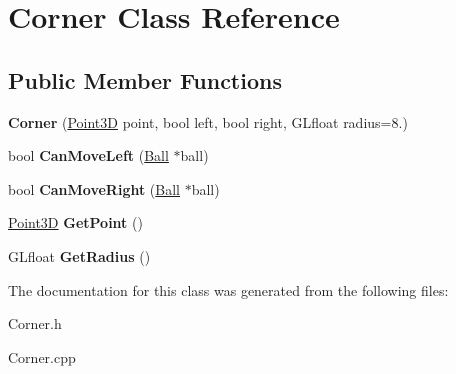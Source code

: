 \hypertarget{class_corner}{\section{Corner Class Reference}
\label{class_corner}
}
\subsection*{Public Member Functions}
\begin{DoxyCompactItemize}
\item 
\hypertarget{class_corner_ab55d2cbce25b09663c8df9bb9ac2210f}{{\bfseries Corner} (\hyperlink{struct_point3_d}{Point3\+D} point, bool left, bool right, G\+Lfloat radius=8.)}\label{class_corner_ab55d2cbce25b09663c8df9bb9ac2210f}

\item 
\hypertarget{class_corner_a4148b59b83d2b9cad19ec13f234766a8}{bool {\bfseries Can\+Move\+Left} (\hyperlink{class_ball}{Ball} $\ast$ball)}\label{class_corner_a4148b59b83d2b9cad19ec13f234766a8}

\item 
\hypertarget{class_corner_a533010b03b15b6c76ad0a9f534018a8c}{bool {\bfseries Can\+Move\+Right} (\hyperlink{class_ball}{Ball} $\ast$ball)}\label{class_corner_a533010b03b15b6c76ad0a9f534018a8c}

\item 
\hypertarget{class_corner_a615f08b3eb5490bdfedf5ca0c1a8f730}{\hyperlink{struct_point3_d}{Point3\+D} {\bfseries Get\+Point} ()}\label{class_corner_a615f08b3eb5490bdfedf5ca0c1a8f730}

\item 
\hypertarget{class_corner_a6fa76d41c90f1684f53e8ceee402ccdb}{G\+Lfloat {\bfseries Get\+Radius} ()}\label{class_corner_a6fa76d41c90f1684f53e8ceee402ccdb}

\end{DoxyCompactItemize}


The documentation for this class was generated from the following files\+:\begin{DoxyCompactItemize}
\item 
Corner.\+h\item 
Corner.\+cpp\end{DoxyCompactItemize}

